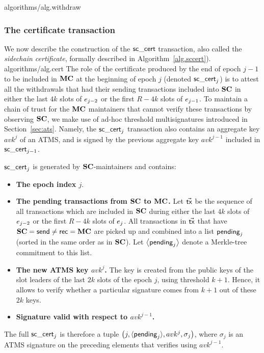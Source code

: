 {algorithms/alg.withdraw}

\subsubsection{The certificate transaction}
\label{sec:sccert}

We now describe the construction of the $\mathsf{sc\_cert}$ transaction, also called the
\emph{sidechain certificate}, formally described in
Algorithm~\ref{alg.sccert}).
{algorithms/alg.cert}
The role of the
certificate produced by the end of epoch $j-1$ to be included in $\mathbf{MC}$ at
the beginning of epoch ${j}$ (denoted $\mathsf{sc\_cert}_{j}$)  is to attest
all the withdrawals that had their sending transactions included
into $\mathbf{SC}$
in either the last $4k$ slots of $e_{j-2}$ or the first $R-4k$ slots
of $e_{j-1}$.
To maintain a chain of trust for the $\mathbf{MC}$ maintainers that cannot
verify these transactions by observing $\mathbf{SC}$, we make use of
ad-hoc threshold multisignatures introduced in Section~\ref{sec:ats}.
Namely, the $\mathsf{sc\_cert}_{j}$ transaction
also contains an aggregate key $avk^{j}$ of an ATMS, and is signed by the
previous aggregate key $avk^{j-1}$ included in $\mathsf{sc\_cert}_{j-1}$.

$\mathsf{sc\_cert}_{j}$ is generated by $\mathbf{SC}$-maintainers
and contains:
\begin{itemize}
    \item
          \textbf{The epoch index $j$}.
    \item
          \textbf{The pending transactions from $\mathbf{SC}$ to $\mathbf{MC}$.}
          Let $\vec{\mathsf{tx}}$ be the sequence of all transactions
          which are included in $\mathbf{SC}$ during either
          the last $4k$ slots of $e_{j-2}$ or the first $R-4k$ slots of
          $e_j$. All transactions in $\vec{\mathsf{tx}}$ that have $\mathbf{SC}=\mathsf{send} \neq \mathsf{rec}=\mathbf{MC}$
          are picked up and combined into a list $\mathsf{pending}_{j}$ (sorted in the
          same order as in $\mathbf{SC}$). Let $\left\langle \mathsf{pending}_{j} \right\rangle$ denote a Merkle-tree commitment to
          this list.

    \item
          \textbf{The new ATMS key $avk^{j}$.}
          The key is created from the public keys of the slot
          leaders of the last $2k$ slots of the epoch $j$, using
          threshold $k+1$. Hence, it allows to verify whether a particular signature comes
          from $k+1$ out of these $2k$ keys.
    \item
          \textbf{Signature valid with respect to $avk^{j-1}$.}
\end{itemize}
The full $\mathsf{sc\_cert}_{j}$ is therefore a tuple
$\left(j,\langle\mathsf{pending}_{j}\rangle,avk^{j},\sigma_{j}\right)$,
where $\sigma_{j}$ is an ATMS signature on the preceding elements that verifies
using $avk^{j-1}$.

